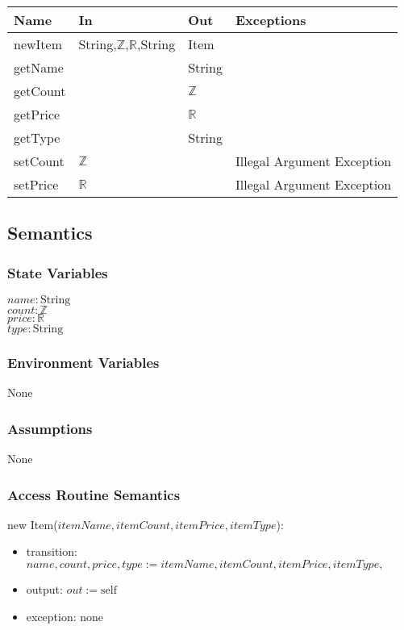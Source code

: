 \documentclass[12pt, titlepage]{article}
\begin{document}
\begin{center}
\begin{tabular}{p{2cm} p{4cm} p{4cm} p{2cm}}
\hline
\textbf{Name} & \textbf{In} & \textbf{Out} & \textbf{Exceptions} \\
\hline
newItem & String,$\mathbb{Z}$,$\mathbb{R}$,String & Item & \\
\hline
getName &  & String & \\
\hline
getCount &  & $\mathbb{Z}$ & \\
\hline
getPrice &  & $\mathbb{R}$ & \\
\hline
getType &  & String & \\
\hline
setCount & $\mathbb{Z}$ &  & Illegal Argument Exception \\
\hline
setPrice & $\mathbb{R}$ &  & Illegal Argument Exception\\
\hline
\end{tabular}
\end{center}

\subsection{Semantics}

\subsubsection{State Variables}
$\mathit{name}: \text{String}$\\
$\mathit{count}: \text{$\mathbb{Z}$}$\\
$\mathit{price}: \text{$\mathbb{R}$}$\\
$\mathit{type}: \text{String}$

\subsubsection{Environment Variables}
None

\subsubsection{Assumptions}
None

\subsubsection{Access Routine Semantics}

\noindent new Item($\mathit{itemName}, \mathit{itemCount}, \mathit{itemPrice}, \mathit{itemType}$):
\begin{itemize}
\item transition: $\mathit{name}, \mathit{count}, \mathit{price}, \mathit{type}:= \mathit{itemName}, \mathit{itemCount}, \mathit{itemPrice}, \mathit{itemType},$
\item output: $out := \mbox{self}$
\item exception: none
\end{itemize}
\end{document}
